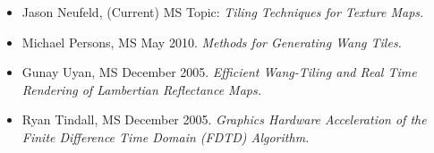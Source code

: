 \documentclass[10pt]{article}
\begin{document}



\begin{itemize}
\item Jason Neufeld, (Current) MS Topic: {\em Tiling Techniques for Texture Maps.}
\item Michael Persons, MS May 2010.
  {\em Methods for Generating Wang Tiles.}
\item Gunay Uyan, MS December 2005. {\em Efficient Wang-Tiling and Real Time
   Rendering of Lambertian Reflectance Maps.}
\item Ryan Tindall, MS December 2005. {\em Graphics Hardware Acceleration
   of the Finite Difference Time Domain (FDTD) Algorithm.}
\end{itemize}

\end{document}
